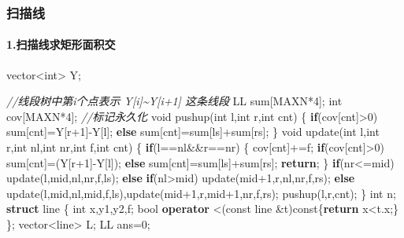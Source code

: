 \documentclass[
]{article}
\newenvironment{Shaded}{}{}
\newcommand{\AttributeTok}[1]{\textcolor[rgb]{0.49,0.56,0.16}{#1}}
\newcommand{\CommentTok}[1]{\textcolor[rgb]{0.38,0.63,0.69}{\textit{#1}}}
\newcommand{\ControlFlowTok}[1]{\textcolor[rgb]{0.00,0.44,0.13}{\textbf{#1}}}
\newcommand{\DataTypeTok}[1]{\textcolor[rgb]{0.56,0.13,0.00}{#1}}
\newcommand{\DecValTok}[1]{\textcolor[rgb]{0.25,0.63,0.44}{#1}}
\newcommand{\KeywordTok}[1]{\textcolor[rgb]{0.00,0.44,0.13}{\textbf{#1}}}
\newcommand{\NormalTok}[1]{#1}
\begin{document}
\hypertarget{ux626bux63cfux7ebf}{%
\subsubsection{扫描线}\label{ux626bux63cfux7ebf}}

\hypertarget{ux626bux63cfux7ebfux6c42ux77e9ux5f62ux9762ux79efux4ea4}{%
\paragraph{1.扫描线求矩形面积交}\label{ux626bux63cfux7ebfux6c42ux77e9ux5f62ux9762ux79efux4ea4}}

\begin{Shaded}
\begin{Highlighting}[]
\NormalTok{vector\textless{}}\DataTypeTok{int}\NormalTok{\textgreater{} Y;}

\CommentTok{//线段树中第i个点表示 Y[i]\textasciitilde{}Y[i+1] 这条线段}
\NormalTok{LL sum[MAXN*}\DecValTok{4}\NormalTok{];}
\DataTypeTok{int}\NormalTok{ cov[MAXN*}\DecValTok{4}\NormalTok{]; }\CommentTok{//标记永久化}
\DataTypeTok{void}\NormalTok{ pushup(}\DataTypeTok{int}\NormalTok{ l,}\DataTypeTok{int}\NormalTok{ r,}\DataTypeTok{int}\NormalTok{ cnt)}
\NormalTok{\{}
    \ControlFlowTok{if}\NormalTok{(cov[cnt]\textgreater{}}\DecValTok{0}\NormalTok{) sum[cnt]=Y[r+}\DecValTok{1}\NormalTok{]{-}Y[l];}
    \ControlFlowTok{else}\NormalTok{ sum[cnt]=sum[ls]+sum[rs];}
\NormalTok{\}}
\DataTypeTok{void}\NormalTok{ update(}\DataTypeTok{int}\NormalTok{ l,}\DataTypeTok{int}\NormalTok{ r,}\DataTypeTok{int}\NormalTok{ nl,}\DataTypeTok{int}\NormalTok{ nr,}\DataTypeTok{int}\NormalTok{ f,}\DataTypeTok{int}\NormalTok{ cnt)}
\NormalTok{\{}
    \ControlFlowTok{if}\NormalTok{(l==nl\&\&r==nr)}
\NormalTok{    \{}
\NormalTok{        cov[cnt]+=f;}
        \ControlFlowTok{if}\NormalTok{(cov[cnt]\textgreater{}}\DecValTok{0}\NormalTok{) sum[cnt]=(Y[r+}\DecValTok{1}\NormalTok{]{-}Y[l]);}
        \ControlFlowTok{else}\NormalTok{ sum[cnt]=sum[ls]+sum[rs];}
        \ControlFlowTok{return}\NormalTok{;}
\NormalTok{    \}}
    \ControlFlowTok{if}\NormalTok{(nr\textless{}=mid) update(l,mid,nl,nr,f,ls);}
    \ControlFlowTok{else} \ControlFlowTok{if}\NormalTok{(nl\textgreater{}mid) update(mid+}\DecValTok{1}\NormalTok{,r,nl,nr,f,rs);}
    \ControlFlowTok{else}\NormalTok{ update(l,mid,nl,mid,f,ls),update(mid+}\DecValTok{1}\NormalTok{,r,mid+}\DecValTok{1}\NormalTok{,nr,f,rs);}
\NormalTok{    pushup(l,r,cnt);}
\NormalTok{\}}
\DataTypeTok{int}\NormalTok{ n;}
\KeywordTok{struct}\NormalTok{ line}
\NormalTok{\{}
    \DataTypeTok{int}\NormalTok{ x,y1,y2,f;}
    \DataTypeTok{bool} \KeywordTok{operator}\NormalTok{ \textless{}(}\AttributeTok{const}\NormalTok{ line \&t)}\AttributeTok{const}\NormalTok{\{}\ControlFlowTok{return}\NormalTok{ x\textless{}t.x;\}}
\NormalTok{\};}
\NormalTok{vector\textless{}line\textgreater{} L;}
\NormalTok{LL ans=}\DecValTok{0}\NormalTok{;}


\end{Highlighting}
\end{Shaded}
\end{document}

